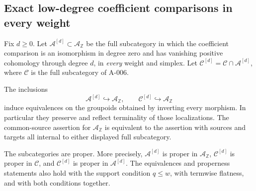 \subsection{Exact low-degree coefficient comparisons in every weight}

Fix $d\geq0$.  Let $\mathcal A^{[d]}\subset\mathcal A_{\mathbb Z}$
be the full subcategory in which the coefficient comparison is
an isomorphism in degree zero and has vanishing positive
cohomology through degree $d$, in \emph{every} weight and simplex.
Let $\mathcal C^{[d]}=\mathcal C\cap\mathcal A^{[d]}$, where
$\mathcal C$ is the full subcategory of A-006.

\begin{theorem}
\label{AS0924}
The inclusions
\[
 \mathcal A^{[d]}\hookrightarrow\mathcal A_{\mathbb Z},
 \qquad
 \mathcal C^{[d]}\hookrightarrow\mathcal A_{\mathbb Z}
 \tag{S09.115}
\]
induce equivalences on the groupoids obtained by inverting
every morphism.  In particular they preserve and reflect
terminality of those localizations.
The common-source assertion for $\mathcal A_{\mathbb Z}$ is
equivalent to the assertion with sources and targets all internal
to either displayed full subcategory.

The subcategories are proper.  More precisely,
$\mathcal A^{[d]}$ is proper in $\mathcal A_{\mathbb Z}$,
$\mathcal C^{[d]}$ is proper in $\mathcal C$, and
$\mathcal C^{[d]}$ is proper in $\mathcal A^{[d]}$.
The equivalences and properness statements also hold with the
support condition $q\leq w$, with termwise flatness, and with
both conditions together.
\end{theorem}

